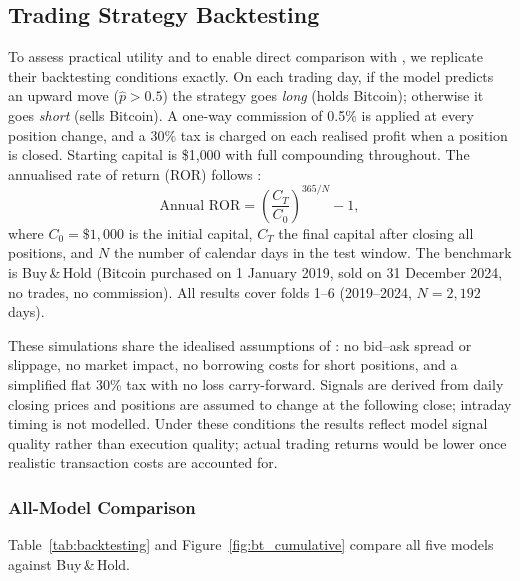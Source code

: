 \documentclass[final,3p,times,authoryear]{elsarticle}
\begin{document}
\subsection{Trading Strategy Backtesting}
\label{sec:backtesting}

To assess practical utility and to enable direct comparison with
\citet{omole2025eaai}, we replicate their backtesting conditions
exactly.
On each trading day, if the model predicts an upward move
($\hat{p} > 0.5$) the strategy goes \emph{long} (holds Bitcoin);
otherwise it goes \emph{short} (sells Bitcoin).
A one-way commission of 0.5\% is applied at every position change,
and a 30\% tax is charged on each realised profit when a position is
closed.
Starting capital is \$1{,}000 with full compounding throughout.
The annualised rate of return (ROR) follows \citet{omole2025eaai}:
\begin{equation}
\text{Annual ROR} = \left(\frac{C_T}{C_0}\right)^{365/N} - 1,
\label{eq:annual_ror}
\end{equation}
where $C_0 = \$1{,}000$ is the initial capital, $C_T$ the final
capital after closing all positions, and $N$ the number of calendar
days in the test window.
The benchmark is Buy\,\&\,Hold (Bitcoin purchased on 1 January 2019,
sold on 31 December 2024, no trades, no commission).
All results cover folds 1--6 (2019--2024, $N = 2{,}192$ days).

These simulations share the idealised assumptions of
\citet{omole2025eaai}: no bid--ask spread or slippage, no market
impact, no borrowing costs for short positions, and a simplified
flat 30\% tax with no loss carry-forward.
Signals are derived from daily closing prices and positions are
assumed to change at the following close; intraday timing is not
modelled.
Under these conditions the results reflect model signal quality
rather than execution quality; actual trading returns would be
lower once realistic transaction costs are accounted for.

\subsubsection{All-Model Comparison}
\label{sec:bt_allmodels}

Table~\ref{tab:backtesting} and Figure~\ref{fig:bt_cumulative}
compare all five models against Buy\,\&\,Hold.
\end{document}
